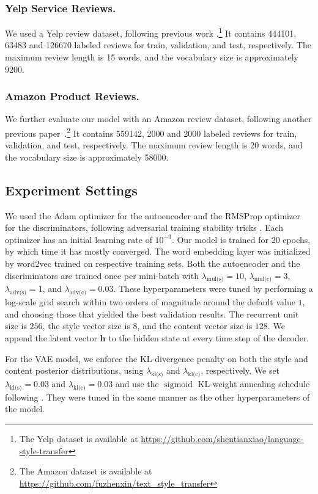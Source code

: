 \documentclass[letterpaper]{article} %
\newcommand{\hyp}[1]{\lambda_{\text{#1}}}
\begin{document}
\subsubsection{Yelp Service Reviews.}
We used a Yelp review dataset, following previous work \cite{shen2017style,zhao2018adversarially}.\footnote{The Yelp dataset is available at \url{https://github.com/shentianxiao/language-style-transfer}}
It contains 444101, 63483 and 126670 labeled reviews for train, validation, and test, respectively.
The maximum review length is 15 words, and the vocabulary size is approximately 9200.

\subsubsection{Amazon Product Reviews.}
We further evaluate our model with an Amazon review dataset, following another previous paper~\cite{fu2018style}.\footnote{The Amazon dataset is available at \url{https://github.com/fuzhenxin/text_style_transfer}}
It contains 559142, 2000 and 2000 labeled reviews for train, validation, and test, respectively.
The maximum review length is 20 words, and the vocabulary size is approximately 58000.


\subsection{Experiment Settings}
We used the Adam optimizer \cite{kingma2014adam} for the autoencoder and the RMSProp optimizer \cite{tieleman2012lecture} for the discriminators, following adversarial training stability tricks \cite{arjovsky2017wasserstein}.
Each optimizer has an initial learning rate of $10^{-3}$.
Our model is trained for 20 epochs, by which time it has mostly converged.
The word embedding layer was initialized by word2vec \cite{mikolov2013distributed} trained on respective training sets.
Both the autoencoder and the discriminators are trained once per mini-batch with $\hyp{mul(s)} = 10$, $\hyp{mul(c)} = 3$, $\hyp{adv(s)} = 1$, and $\hyp{adv(c)} = 0.03$.
These hyperparameters were tuned by performing a log-scale grid search within two orders of magnitude around the default value $1$, and choosing those that yielded the best validation results.
The recurrent unit size is $256$, the style vector size is $8$, and the content vector size is $128$.
We append the latent vector $\bm h$ to the hidden state at every time step of the decoder.

For the VAE model, we enforce the KL-divergence penalty on both the style and content posterior distributions, using $\hyp{kl(s)}$ and $\hyp{kl(c)}$, respectively.
We set $\hyp{kl(s)} = 0.03$ and $\hyp{kl(c)} = 0.03$ and use the $\operatorname{sigmoid}$ KL-weight annealing schedule following \citet{bahuleyan2018probabilistic}.
They were tuned in the same manner as the other hyperparameters of the model.
\end{document}

